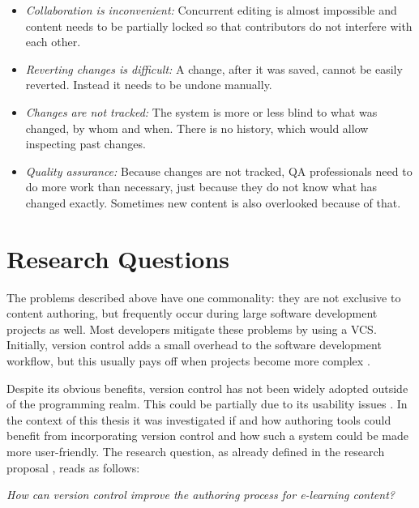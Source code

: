 
\begin{itemize}
  \item \textit{Collaboration is inconvenient:} Concurrent editing is almost impossible and content needs to be partially locked so that contributors do not interfere with each other.
  \item \textit{Reverting changes is difficult:} A change, after it was saved, cannot be easily reverted. Instead it needs to be undone manually.
  \item \textit{Changes are not tracked:} The system is more or less blind to what was changed, by whom and when. There is no history, which would allow inspecting past changes.
  \item \textit{Quality assurance:} Because changes are not tracked, \ac{QA} professionals need to do more work than necessary, just because they do not know what has changed exactly. Sometimes new content is also overlooked because of that.
\end{itemize}


\section{Research Questions} %
The problems described above have one commonality: they are not exclusive to content authoring, but frequently occur during large software development projects as well. Most developers mitigate these problems by using a \ac{VCS}. Initially, version control adds a small overhead to the software development workflow, but this usually pays off when projects become more complex \cite{spinellis_version_2005}.

Despite its obvious benefits, version control has not been widely adopted outside of the programming realm. This could be partially due to its usability issues \cite{church_case_2014,perez_de_rosso_whats_2013}.
In the context of this thesis it was investigated if and how authoring tools could benefit from incorporating version control and how such a system could be made more user-friendly. The research question, as already defined in the research proposal \cite{kreiser_master_2015}, reads as follows:

\begin{center}
 \textit{How can version control improve the authoring process for e-learning content?}
\end{center}

